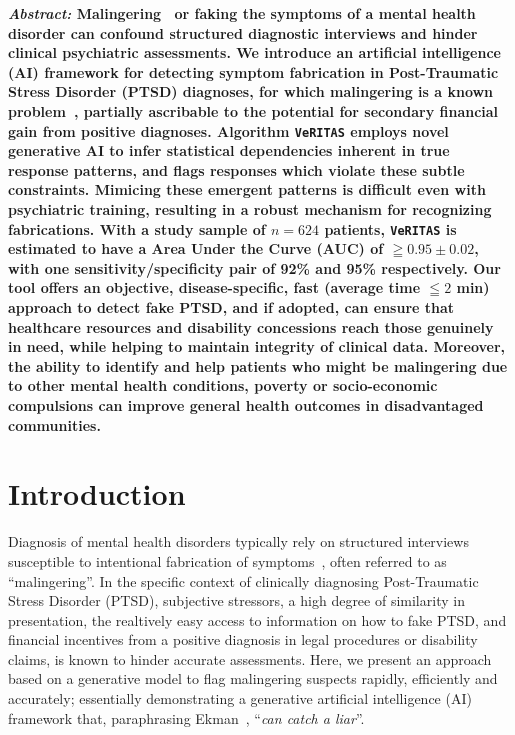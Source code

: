 \documentclass[onecolumn,10pt]{IEEEtran}
\def\vrts{\texttt{VeRITAS}\xspace}
\begin{document}
\maketitle


{\bf \sffamily \fontsize{10}{12}\selectfont \noindent   
  {\normalfont \itshape Abstract:} Malingering~\cite{Rogers1997,rogers2008clinical} or faking  the symptoms of a mental health disorder  can confound structured diagnostic interviews and hinder clinical psychiatric assessments.  We introduce an  artificial intelligence (AI) framework for detecting symptom fabrication in Post-Traumatic Stress Disorder (PTSD) diagnoses, for which malingering is a known problem~\cite{frueh2007us,taylor2007detection}, partially ascribable to the  potential for secondary financial gain from positive diagnoses.  Algorithm \vrts employs novel generative AI to infer statistical dependencies inherent in true response patterns, and flags  responses which violate these subtle  constraints. Mimicing these  emergent  patterns is difficult  even  with psychiatric training, resulting in a robust mechanism for recognizing fabrications. With a study sample of $n=624$ patients, \vrts is estimated to have a   Area Under the Curve (AUC) of $\geqq 0.95\pm 0.02$, with one sensitivity/specificity pair  of 92\% and 95\% respectively. Our tool   offers an  objective, disease-specific, fast (average time $\leqq 2$ min)  approach to detect fake  PTSD, and if adopted, can  ensure that healthcare resources and disability concessions reach  those genuinely in need,  while  helping to maintain  integrity of clinical data. Moreover, the ability to identify and help  patients who might be malingering due to other mental health conditions, poverty or   socio-economic compulsions can  improve general health outcomes  in disadvantaged communities.  
}







\vspace{10pt} 

\section*{Introduction}
Diagnosis of mental health disorders typically  rely  on structured interviews~\cite{ali2015multimodal} susceptible to  intentional fabrication of  symptoms~\cite{Rogers1997,rogers2008clinical}, often referred to as ``malingering''. In the specific context of clinically diagnosing Post-Traumatic Stress Disorder (PTSD),  subjective stressors, a high degree of similarity in presentation,  the realtively easy access to  information on  how to fake PTSD,  and financial  incentives from a positive diagnosis  in  legal procedures or   disability claims, is known to hinder   accurate   assessments. Here, we present an approach based on a  generative model to flag malingering suspects rapidly, efficiently and accurately; essentially demonstrating a generative artificial intelligence (AI) framework that, paraphrasing Ekman~\cite{Ekman1992},  ``\textit{can catch a liar}''. 
\end{document}
